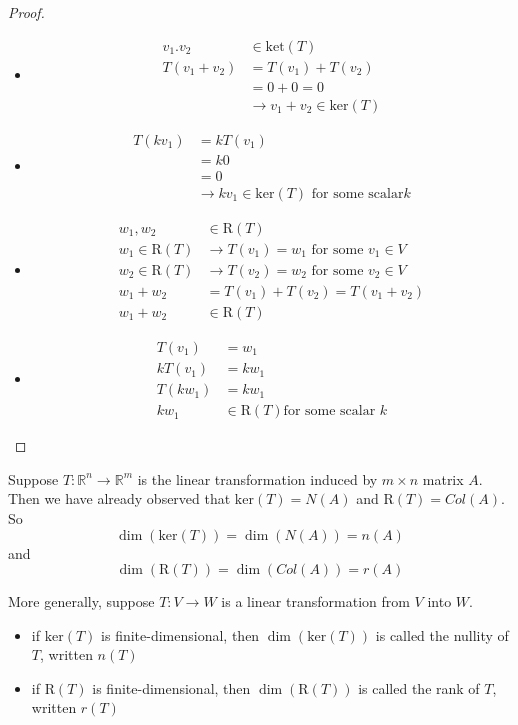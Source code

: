 \documentclass[12pt]{article}
\begin{document}
 \begin{proof} \begin{itemize} 
 \item $$ \begin{aligned} v_1. v_2 &\in \mathrm{ket}(T) \\ T(v_1 + v_2) &= T(v_1) + T(v_2) \\ &= 0 + 0 = 0 \\ &\rightarrow v_1 + v_2 \in \mathrm{ker}(T) \end{aligned} $$ 
 \item $$\begin{aligned} T(kv_1) &= kT(v_1) \\ &= k0 \\ &=  0 \\ &\rightarrow kv_1 \in \mathrm{ker}(T) \text{ for some scalar} k \end{aligned} $$ 
 \item $$\begin{aligned} w_1, w_2 &\in \mathrm{R}(T) \\ w_1 \in \mathrm{R}(T) &\rightarrow T(v_1) = w_1 \text{ for some } v_1 \in V \\ w_2 \in \mathrm{R}(T) &\rightarrow T(v_2) = w_2 \text{ for some } v_2 \in V \\ w_1 + w_2 &= T(v_1) + T(v_2) = T(v_1 + v_2) \\ w_1 + w_2 &\in \mathrm{R}(T) \end{aligned} $$ 
 \item $$\begin{aligned}  T(v_1) &= w_1 \\ kT(v_1) &= kw_1 \\ T(kw_1) &= kw_1 \\ kw_1 &\in \mathrm{R}(T) \text{for some scalar } k \end{aligned} $$ \end{itemize} \end{proof} 
 Suppose $T: \mathbb{R}^n \to \mathbb{R}^m$ is the linear transformation induced by $m \times n$ matrix $A$. Then we have already observed that $\mathrm{ker}(T) = N(A)$ and $\mathrm{R}(T) = Col(A)$. So $$\dim(\mathrm{ker}(T)) = \dim(N(A)) = n(A) $$ and $$\dim(\mathrm{R}(T)) = \dim(Col(A)) = r(A) $$ 
 \begin{definition} More generally, suppose $T: V \to W$ is a linear transformation from $V$ into $W$. \begin{itemize} 
\item if $\mathrm{ker}(T)$ is finite-dimensional, then $\dim(\mathrm{ker}(T))$ is called the nullity of $T$, written $n(T)$
\item if $\mathrm{R}(T)$ is finite-dimensional, then $\dim(\mathrm{R}(T))$ is called the rank of $T$, written $r(T)$ \end{itemize} \end{definition} 
\end{document}
